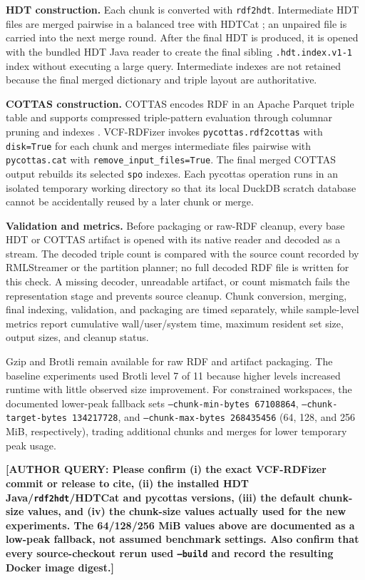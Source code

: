 \documentclass[pdflatex,sn-mathphys-num]{sn-jnl}%
\newenvironment{revision}{\begingroup\color{revisionblue}}{\endgroup}%
\newcommand{\authorquery}[1]{%
  \par\smallskip\noindent
  {\color{queryorange}\textbf{[AUTHOR QUERY: #1]}}%
  \par\smallskip
}%
\theoremstyle{thmstyleone}%
\theoremstyle{thmstyletwo}%
\theoremstyle{thmstylethree}%
\begin{document}
\begin{revision}
\textbf{HDT construction.}
Each chunk is converted with \texttt{rdf2hdt}. Intermediate HDT files are merged pairwise in a balanced tree with HDTCat \cite{Diefenbach2020HDTCat}; an unpaired file is carried into the next merge round. After the final HDT is produced, it is opened with the bundled HDT Java reader to create the final sibling \texttt{.hdt.index.v1-1} index without executing a large query. Intermediate indexes are not retained because the final merged dictionary and triple layout are authoritative.

\textbf{COTTAS construction.}
COTTAS encodes RDF in an Apache Parquet triple table and supports compressed triple-pattern evaluation through columnar pruning and indexes \cite{cottas_2025,pycottas_2026}. VCF-RDFizer invokes \texttt{pycottas.rdf2cottas} with \texttt{disk=True} for each chunk and merges intermediate files pairwise with \texttt{pycottas.cat} with \texttt{remove\_input\_files=True}. The final merged COTTAS output rebuilds its selected \texttt{spo} indexes. Each pycottas operation runs in an isolated temporary working directory so that its local DuckDB scratch database cannot be accidentally reused by a later chunk or merge.

\textbf{Validation and metrics.}
Before packaging or raw-RDF cleanup, every base HDT or COTTAS artifact is opened with its native reader and decoded as a stream. The decoded triple count is compared with the source count recorded by RMLStreamer or the partition planner; no full decoded RDF file is written for this check. A missing decoder, unreadable artifact, or count mismatch fails the representation stage and prevents source cleanup. Chunk conversion, merging, final indexing, validation, and packaging are timed separately, while sample-level metrics report cumulative wall/user/system time, maximum resident set size, output sizes, and cleanup status.

Gzip and Brotli \cite{brotli_2019} remain available for raw RDF and artifact packaging. The baseline experiments used Brotli level 7 of 11 because higher levels increased runtime with little observed size improvement. For constrained workspaces, the documented lower-peak fallback sets \texttt{--chunk-min-bytes 67108864}, \texttt{--chunk-target-bytes 134217728}, and \texttt{--chunk-max-bytes 268435456} (64, 128, and 256 MiB, respectively), trading additional chunks and merges for lower temporary peak usage.
\end{revision}
\authorquery{Please confirm (i) the exact VCF-RDFizer commit or release to cite, (ii) the installed HDT Java/\texttt{rdf2hdt}/HDTCat and pycottas versions, (iii) the default chunk-size values, and (iv) the chunk-size values actually used for the new experiments. The 64/128/256 MiB values above are documented as a low-peak fallback, not assumed benchmark settings. Also confirm that every source-checkout rerun used \texttt{--build} and record the resulting Docker image digest.}
\end{document}
